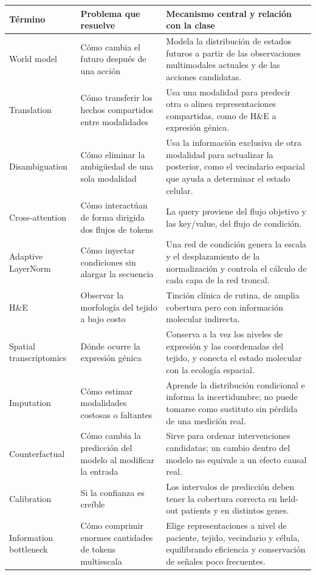 \begin{center}
\small
\begin{tabularx}{\textwidth}{p{} X X}
\toprule
\textbf{Término} & \textbf{Problema que resuelve} & \textbf{Mecanismo central y relación con la clase} \\
\midrule
World model & Cómo cambia el futuro después de una acción & Modela la distribución de estados futuros a partir de las observaciones multimodales actuales y de las acciones candidatas. \\
Translation & Cómo transferir los hechos compartidos entre modalidades & Usa una modalidad para predecir otra o alinea representaciones compartidas, como de H\&E a expresión génica. \\
Disambiguation & Cómo eliminar la ambigüedad de una sola modalidad & Usa la información exclusiva de otra modalidad para actualizar la posterior, como el vecindario espacial que ayuda a determinar el estado celular. \\
Cross-attention & Cómo interactúan de forma dirigida dos flujos de tokens & La query proviene del flujo objetivo y las key/value, del flujo de condición. \\
Adaptive LayerNorm & Cómo inyectar condiciones sin alargar la secuencia & Una red de condición genera la escala y el desplazamiento de la normalización y controla el cálculo de cada capa de la red troncal. \\
H\&E & Observar la morfología del tejido a bajo costo & Tinción clínica de rutina, de amplia cobertura pero con información molecular indirecta. \\
Spatial transcriptomics & Dónde ocurre la expresión génica & Conserva a la vez los niveles de expresión y las coordenadas del tejido, y conecta el estado molecular con la ecología espacial. \\
Imputation & Cómo estimar modalidades costosas o faltantes & Aprende la distribución condicional e informa la incertidumbre; no puede tomarse como sustituto sin pérdida de una medición real. \\
Counterfactual & Cómo cambia la predicción del modelo al modificar la entrada & Sirve para ordenar intervenciones candidatas; un cambio dentro del modelo no equivale a un efecto causal real. \\
Calibration & Si la confianza es creíble & Los intervalos de predicción deben tener la cobertura correcta en held-out patients y en distintos genes. \\
Information bottleneck & Cómo comprimir enormes cantidades de tokens multiescala & Elige representaciones a nivel de paciente, tejido, vecindario y célula, equilibrando eficiencia y conservación de señales poco frecuentes. \\
\bottomrule
\end{tabularx}
\end{center}

